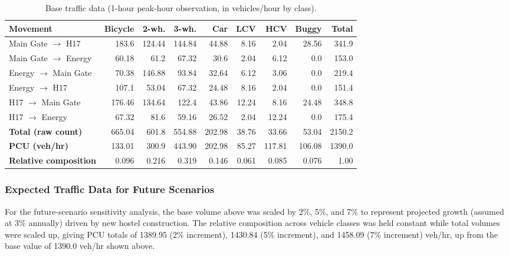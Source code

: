\documentclass[11pt]{article}
\begin{document}
\begin{table}[H]
  \centering
  \small
  \caption{Base traffic data (1-hour peak-hour observation, in vehicles/hour by class).}
  \begin{tabular}{@{}lrrrrrrrr@{}}
    \toprule
    \textbf{Movement} & \textbf{Bicycle} & \textbf{2-wh.} & \textbf{3-wh.} & \textbf{Car} & \textbf{LCV} & \textbf{HCV} & \textbf{Buggy} & \textbf{Total} \\
    \midrule
    Main Gate $\to$ H17     & 183.6 & 124.44 & 144.84 & 44.88 & 8.16 & 2.04  & 28.56 & 341.9 \\
    Main Gate $\to$ Energy  & 60.18 & 61.2   & 67.32  & 30.6  & 2.04 & 6.12  & 0.0   & 153.0 \\
    Energy $\to$ Main Gate  & 70.38 & 146.88 & 93.84  & 32.64 & 6.12 & 3.06  & 0.0   & 219.4 \\
    Energy $\to$ H17        & 107.1 & 53.04  & 67.32  & 24.48 & 8.16 & 2.04  & 0.0   & 151.4 \\
    H17 $\to$ Main Gate     & 176.46 & 134.64 & 122.4 & 43.86 & 12.24 & 8.16 & 24.48 & 348.8 \\
    H17 $\to$ Energy        & 67.32 & 81.6   & 59.16  & 26.52 & 2.04 & 12.24 & 0.0   & 175.4 \\
    \midrule
    \textbf{Total (raw count)}   & 665.04 & 601.8 & 554.88 & 202.98 & 38.76 & 33.66 & 53.04 & 2150.2 \\
    \textbf{PCU (veh/hr)}        & 133.01 & 300.9 & 443.90 & 202.98 & 85.27 & 117.81 & 106.08 & 1390.0 \\
    \textbf{Relative composition} & 0.096 & 0.216 & 0.319 & 0.146 & 0.061 & 0.085 & 0.076 & 1.00 \\
    \bottomrule
  \end{tabular}
\end{table}

\subsubsection{Expected Traffic Data for Future Scenarios}
For the future-scenario sensitivity analysis, the base volume above was scaled by 2\%, 5\%, and 7\% to
represent projected growth (assumed at 3\% annually) driven by new hostel construction. The relative
composition across vehicle classes was held constant while total volumes were scaled up, giving PCU
totals of 1389.95 (2\% increment), 1430.84 (5\% increment), and 1458.09 (7\% increment) veh/hr, up from
the base value of 1390.0 veh/hr shown above.
\end{document}
